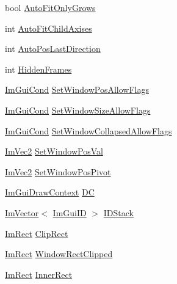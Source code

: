 \begin{DoxyCompactItemize}
bool \mbox{\hyperlink{struct_im_gui_window_a3583d20a57fea8c8491f14f2dcda483c}{Auto\+Fit\+Only\+Grows}}
\item 
int \mbox{\hyperlink{struct_im_gui_window_ad323df685c026a4557912a5090414abe}{Auto\+Fit\+Child\+Axises}}
\item 
int \mbox{\hyperlink{struct_im_gui_window_ab057309fa22a6973a081448403a5baf4}{Auto\+Pos\+Last\+Direction}}
\item 
int \mbox{\hyperlink{struct_im_gui_window_a91f60ca5e2e9ff4c34957e7cc239193e}{Hidden\+Frames}}
\item 
\mbox{\hyperlink{imgui_8h_aef890d6ac872e12c5804d0b3e4f7f103}{Im\+Gui\+Cond}} \mbox{\hyperlink{struct_im_gui_window_a8ff69a8bdc9221c9cc7d8ba656013d84}{Set\+Window\+Pos\+Allow\+Flags}}
\item 
\mbox{\hyperlink{imgui_8h_aef890d6ac872e12c5804d0b3e4f7f103}{Im\+Gui\+Cond}} \mbox{\hyperlink{struct_im_gui_window_a0c9419d95253214cb2a71d6ead1e03d6}{Set\+Window\+Size\+Allow\+Flags}}
\item 
\mbox{\hyperlink{imgui_8h_aef890d6ac872e12c5804d0b3e4f7f103}{Im\+Gui\+Cond}} \mbox{\hyperlink{struct_im_gui_window_a48384a3767252325e5c71b534adc58a9}{Set\+Window\+Collapsed\+Allow\+Flags}}
\item 
\mbox{\hyperlink{struct_im_vec2}{Im\+Vec2}} \mbox{\hyperlink{struct_im_gui_window_a6caed47ef8e25a2e7a68a6be72c5716a}{Set\+Window\+Pos\+Val}}
\item 
\mbox{\hyperlink{struct_im_vec2}{Im\+Vec2}} \mbox{\hyperlink{struct_im_gui_window_a4de5608bf44728447327d832fa84f0c9}{Set\+Window\+Pos\+Pivot}}
\item 
\mbox{\hyperlink{struct_im_gui_draw_context}{Im\+Gui\+Draw\+Context}} \mbox{\hyperlink{struct_im_gui_window_a3a20c68996093058481ae8e174258a04}{DC}}
\item 
\mbox{\hyperlink{class_im_vector}{Im\+Vector}}$<$ \mbox{\hyperlink{imgui_8h_a1785c9b6f4e16406764a85f32582236f}{Im\+Gui\+ID}} $>$ \mbox{\hyperlink{struct_im_gui_window_a1a71724c43e37830ed9b38bd34f26917}{I\+D\+Stack}}
\item 
\mbox{\hyperlink{struct_im_rect}{Im\+Rect}} \mbox{\hyperlink{struct_im_gui_window_a9950a40b18de2579c4d3deb0ab33f455}{Clip\+Rect}}
\item 
\mbox{\hyperlink{struct_im_rect}{Im\+Rect}} \mbox{\hyperlink{struct_im_gui_window_ae0af9ff6c93baad6848143dd9d742ddd}{Window\+Rect\+Clipped}}
\item 
\mbox{\hyperlink{struct_im_rect}{Im\+Rect}} \mbox{\hyperlink{struct_im_gui_window_a0fd27908ebffb5d9509dc9e7f199d67d}{Inner\+Rect}}

\end{DoxyCompactItemize}
